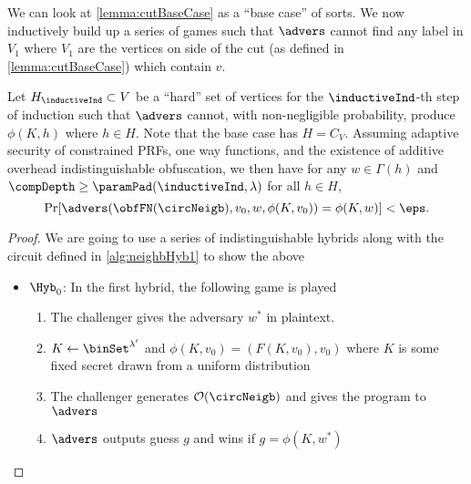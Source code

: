 We can look at \cref{lemma:cutBaseCase} as a ``base case'' of sorts. We now inductively build up a series of games
such that $\advers$ cannot find any label in $V_1$ where $V_1$ are the vertices on side of the cut (as defined in \cref{lemma:cutBaseCase})
which contain $v$.

\begin{lemma}
	Let $H_\inductiveInd \subset V$ be a ``hard'' set of vertices for the $\inductiveInd$-th step of induction such that $\advers$ cannot, with non-negligible probability, produce 
	$\phi(K, h)$ where $h \in H$. Note that the base case has $H = C_V$. 
	Assuming adaptive security of constrained PRFs, one way functions, and the existence of additive overhead indistinguishable obfuscation,
	we then have
	for any $w \in \Gamma(h)$ and $\compDepth \geq \paramPad(\inductiveInd, \lambda)$ for all $h \in H$, 
	\begin{equation*}
		\Pr[\advers(\obfFN(\circNeigb), v_0, w, \phi(K, v_0)) = \phi(K, w)] < \eps.
	\end{equation*}
	\begin{proof}
		We are going to use a series of indistinguishable hybrids along with the circuit defined in \ref{alg:neighbHyb1} to show the above
		\begin{itemize}
			\item $\Hyb_0$: In the first hybrid, the following game is played
				\begin{enumerate}
					\item The challenger gives the adversary $w^*$ in plaintext.
					\item $K \gets \binSet^{\lambda'}$ and $\phi(K, v_0) = (F(K, v_0), v_0)$ where $K$ is some fixed secret drawn from a uniform distribution
					\item The challenger generates $\mathcal{O}(\circNeigb)$ and gives the program to $\advers$
					\item $\advers$ outputs guess $g$ and wins if $g = \phi(K, w^*)$ %
				\end{enumerate}
			

\end{itemize}
\end{proof}
\end{lemma}
